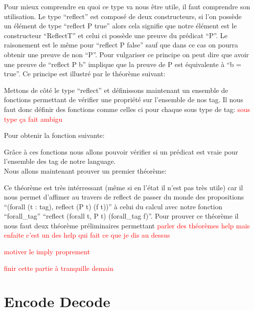 \documentclass {article}
\newcommand{\codefrom}[3]
           {}
\theoremstyle{definition}
\theoremstyle{remark}
\newcommand{\todo}[1]{\textcolor{red}{#1}}
\begin{document}
\codefrom{src}{association_list}{reflect}

Pour mieux comprendre en quoi ce type va nous être utile, il faut comprendre son utilisation.
Le type ``reflect'' est composé de deux constructeurs, si l'on possède un élément de type
``reflect P true'' alors cela signifie que notre élément est le constructeur ``ReflectT''
et celui ci possède une preuve du prédicat ``P''. Le raisonement est le même pour ``reflect P false''
sauf que dans ce cas on pourra obtenir une preuve de non ``P''. Pour vulgariser ce
principe on peut dire que avoir une preuve de ``reflect P b'' implique que la preuve
de P est équivalente à ``b = true''. Ce principe est illustré par le théorème suivant:

\codefrom{rapport}{definitions}{reflect_iff}


Mettons de côté le type ``reflect'' et définissons maintenant un ensemble de
fonctions permettant de vérifier une propriété sur l'ensemble de nos tag.
Il nous faut donc définir des fonctions comme celles ci pour chaque sous type de tag: \todo{sous type ça fait ambigu}

\codefrom{src}{association_list}{forall_tag_uno}

Pour obtenir la fonction suivante:

\codefrom{src}{association_list}{forall_tag}

Grâce à ces fonctions nous allons pouvoir vérifier si un prédicat est vraie pour l'ensemble des tag
de notre language. \\

Nous allons maintenant prouver un premier théorème:
\codefrom{src}{association_list}{forall_tagP}

Ce théorème est très intérressant (même si en l'état il n'est pas très utile) car il nous permet
d'affimer au travers de reflect de passer du monde des propositions ``(forall (t : tag), reflect (P t) (f t))''
à celui du calcul avec notre fonction ``forall\_tag'' ``reflect (forall t, P t) (forall\_tag f)''.
Pour prouver ce théorème il nous faut deux théorème préliminaires permettant
\todo{parler des théorèmes help mais enfaite c'est un des help qui fait ce que je dis au dessus}


\todo{motiver le imply proprement}

\codefrom{src}{association_list}{implyP}

\todo{finir cette partie à tranquille demain}


\section{Encode Decode}
\end{document}
